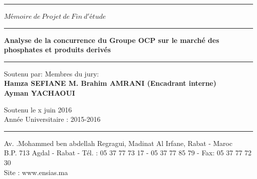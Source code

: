 \begin{titlepage}
\begin{center}
	\rule{\linewidth}{1pt}
	
	\vspace{4.65cm}
	
	\huge $Mémoire \ de \ Projet \ de \ Fin \ d'étude$
	
	\vspace{1.5cm} 
	
	\rule{\linewidth}{2pt}
	
	\Large
	\textbf{Analyse de la concurrence du Groupe OCP sur le marché des phosphates et produits derivés}
	
	\rule{\linewidth}{2pt}
	
	\vspace{1.5cm}
	
	\begin{flushleft}
	
	\normalsize{Soutenu par:} \hfill Membres du jury: \\
	\vspace{10pt}
	\textbf{Hamza SEFIANE \hfill M. Brahim AMRANI (Encadrant interne)} \\
	\textbf{Ayman YACHAOUI \hfill}
	
	\end{flushleft}
	
	\begin{center}
	
			\vspace{72pt}
			\normalsize{Soutenu le x juin 2016} \\
			\vspace{39pt}
			Année Universitaire : 2015-2016
			\vspace{6pt}
			
			\rule{\linewidth}{1pt}
			\footnotesize Av. .Mohammed ben abdellah Regragui, Madinat Al Irfane, Rabat - Maroc\\
			B.P. 713 Agdal - Rabat - Tél. : 05 37 77 73 17 - 05 37 77 85 79 - Fax: 05 37 77 72 30\\
			Site : www.ensias.ma 
	
	\end{center}
	
\end{center}

\end{titlepage}